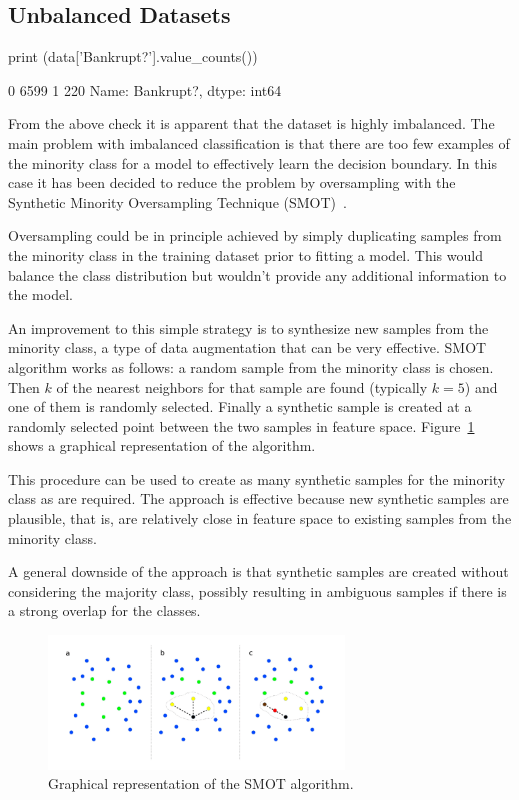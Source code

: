 \subsection{Unbalanced Datasets}

\begin{ipython}
print (data['Bankrupt?'].value_counts())
\end{ipython}
\begin{ioutput}
0    6599
1     220
Name: Bankrupt?, dtype: int64
\end{ioutput}

From the above check it is apparent that the dataset is highly imbalanced. The main problem with imbalanced classification is that there are too few examples of the minority class for a model to effectively learn the decision boundary. In this case it has been decided to reduce the problem by oversampling with the Synthetic Minority Oversampling Technique (SMOT)~\cite{bib:smot}. 

\begin{attention}
Oversampling could be in principle achieved by simply duplicating samples from the minority class in the training dataset prior to fitting a model. This would balance the class distribution but wouldn't provide any additional information to the model.
	
An improvement to this simple strategy is to synthesize new samples from the minority class, a type of data augmentation that can be very effective.
SMOT algorithm works as follows: a random sample from the minority class is chosen. Then $k$ of the nearest neighbors for that sample are found (typically $k=5$) and one of them is randomly selected. Finally a synthetic sample is created at a randomly selected point between the two samples in feature space.
Figure~\ref{fig:smote} shows a graphical representation of the algorithm.

This procedure can be used to create as many synthetic samples for the minority class as are required. 
The approach is effective because new synthetic samples are plausible, that is, are relatively close in feature space to existing samples from the minority class.

A general downside of the approach is that synthetic samples are created without considering the majority class, possibly resulting in ambiguous samples if there is a strong overlap for the classes.
\end{attention}

\begin{figure}[htb]
\centering
\includegraphics[width=0.7\textwidth]{figures/smote}
\caption{Graphical representation of the SMOT algorithm.}
\label{fig:smote}
\end{figure}


